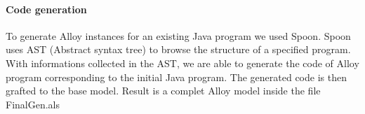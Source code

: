 \paragraph{Code generation}
To generate Alloy instances for an existing Java program we used Spoon. Spoon uses AST (Abstract syntax tree)\cite{ast} to browse the structure of a specified program. With informations collected in the AST, we are able to generate the code of Alloy program corresponding to the initial Java program. The generated code is then grafted to the base model.
Result is a complet Alloy model inside the file FinalGen.als